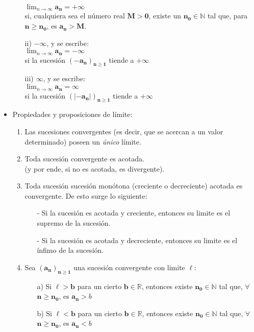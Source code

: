 \documentclass[a4paper,11pt]{report}
\begin{document}
\begin{itemize}
\begin{itemize}
$\displaystyle \lim_{n\to\infty}  \mathbf{a_n} = +\infty$ \\[5pt]
 si, cualquiera sea el número real $\mathbf{M > 0}$, existe un $\mathbf{n_0} \in \mathbb{N}$ tal que, para $\mathbf{n \geqslant n_0}$, es $\mathbf{a_n > M}$.
\item[ii)] $-\infty$, y se escribe: \\
$\displaystyle \lim_{n\to\infty}  \mathbf{a_n} = -\infty$ \\[5pt]
si la sucesión $\mathbf{(-a_n)_{n \geqslant 1}}$ tiende a $+\infty$
\item[iii)] $\infty$, y se escribe: \\
$\displaystyle \lim_{n\to\infty}  \mathbf{a_n} = \infty$ \\[5pt]
si la sucesión  $\mathbf{(|-a_n|)_{n \geqslant 1}}$ tiende a $+\infty$
\end{itemize}
\item Propiedades y proposiciones de límite:
\begin{enumerate}
\item Las sucesiones convergentes (es decir, que se acercan a un valor determinado) poseen un \emph{único} límite.
\item Toda sucesión convergente es acotada. \\
 (y por ende, si no es acotada, es divergente).
\item Toda sucesión sucesión monótona (creciente o decreciente) acotada es convergente. De esto surge lo siguiente: \\
\begin{itemize}
\item[-] Si la sucesión es acotada y creciente, entonces su limite es el supremo de la sucesión.
\item[-] Si la sucesión es acotada y decreciente, entonces su limite es el ínfimo de la sucesión.
\end{itemize}
\item Sea $\mathbf{(a_n)_{n \geqslant 1}}$ una sucesión convergente con limite $\ell$:
\begin{itemize}
\item[a)] Si $\ell > \mathbf{b}$ para un cierto $\mathbf{b} \in \mathbb{R}$, entonces existe $\mathbf{n_0} \in \mathbb{N}$ tal que, $\forall$ $\mathbf{n} \geqslant \mathbf{n_0}$, es $\mathbf{a_n} > b$
\item[b)] Si $\ell < \mathbf{b}$ para un cierto $\mathbf{b} \in \mathbb{R}$, entonces existe $\mathbf{n_0} \in \mathbb{N}$ tal que, $\forall$ $\mathbf{n} \geqslant \mathbf{n_0}$, es $\mathbf{a_n} < b$

\end{itemize}
\end{enumerate}
\end{itemize}
\end{document}
